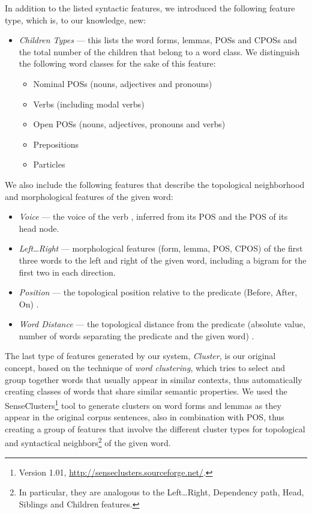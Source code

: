 \documentclass[12pt,notitlepage,a4paper]{report}
\begin{document}
In addition to the listed syntactic features, we introduced the following feature type, which is, to our knowledge, new:
\begin{itemize}
    \item \emph{Children Types} --- this lists the word forms, lemmas, POSs and CPOSs and the total number of the children that belong to a word class. We distinguish the following word classes for the sake of this feature:
    \begin{itemize}
        \item Nominal POSs (nouns, adjectives and pronouns)
        \item Verbs (including modal verbs)
        \item Open POSs (nouns, adjectives, pronouns and verbs)
        \item Prepositions
        \item Particles
    \end{itemize}
\end{itemize}

We also include the following features that describe the topological neighborhood and morphological features of the given word:
\begin{itemize}
    \item \emph{Voice} --- the voice of the verb \citep{che09}, inferred from its POS and the POS of its head node.
    \item \emph{Left\dots Right} --- morphological features (form, lemma, POS, CPOS) of the first three words to the left and right of the given word, including a bigram for the first two in each direction.
    \item \emph{Position} --- the topological position relative to the predicate (Before, After, On) \citep{nugues09}.
    \item \emph{Word Distance} --- the topological distance from the predicate (absolute value, number of words separating the predicate and the given word) \citep{asahara09}.
\end{itemize}

The last type of features generated by our system, \emph{Cluster}, is our original concept, based on the technique of \emph{word clustering}\citep{pereira93}, which tries to select and group together words that usually appear in similar contexts, thus automatically creating classes of words that share similar semantic properties. We used the SenseClusters\footnote{Version 1.01, \url{http://senseclusters.sourceforge.net/}.} tool \citep{kulkarni05} to generate clusters on word forms and lemmas as they appear in the original corpus sentences, also in combination with POS, thus creating a group of features that involve the different cluster types for topological and syntactical neighbors\footnote{In particular, they are analogous to the Left\dots Right, Dependency path, Head, Siblings and Children features.} of the given word.
\end{document}
